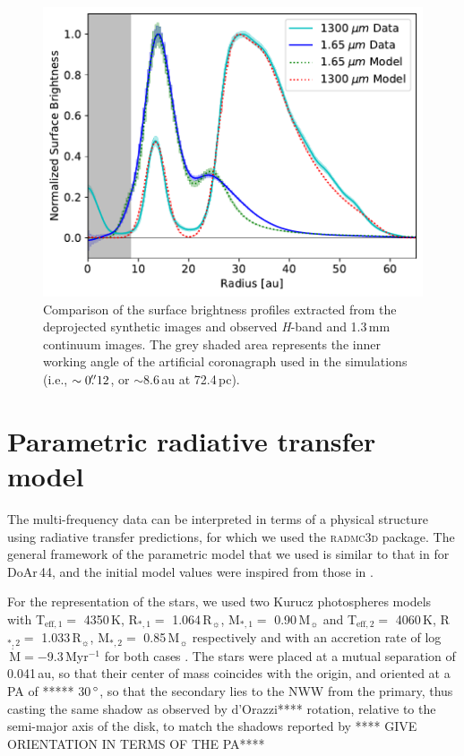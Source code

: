 \documentclass[letters,usenatbib,times]{mnras}
\begin{document}
\begin{figure}
	\includegraphics[width=\columnwidth]{comp_fig_all_profiles_au.pdf}
    \caption{Comparison of the surface brightness profiles extracted from the deprojected synthetic images and observed \textit{H}-band and 1.3\,mm continuum images. The grey shaded area represents the inner working angle of the artificial coronagraph used in the simulations (i.e., $\sim0\hbox{$.\!\!^{\prime\prime}$} 12$, or $\sim$8.6\,au at 72.4\,pc).}
    \label{fig:radprofiles}
\end{figure}

\section{Parametric radiative transfer model} \label{sec:model}

The multi-frequency data can be interpreted in terms of a physical
structure using radiative transfer predictions, for which we used the
\textsc{radmc3d} package\citep{Dullemond_2012}. The general framework
of the parametric model that we used is similar to that in
\citet{2018MNRAS.477.5104C} for DoAr\,44, and the initial model
values were inspired from those in \citet{Rosenfeld_2013}.

For the representation of the stars, we used two Kurucz photospheres models \citep{1979ApJS...40....1K, 1997A&A...318..841C} with T$_{\mathrm{eff},1} =$ 4350\,K, R$_{*,1} =$ 1.064\,R$_{\sun}$, M$_{*,1} =$ 0.90\,M$_{\sun}$ and T$_{\mathrm{eff},2} =$ 4060\,K, R$_{*,2} =$ 1.033\,R$_{\sun}$, M$_{*,2} =$ 0.85\,M$_{\sun}$ respectively and with an accretion rate of log$\,\dot{\mathrm{M}} = -$9.3\,Myr$^{-1}$ for both cases \citep{10.1111/j.1365-2966.2011.19366.x}. The stars were placed at a  mutual separation of 0.041\,au, so that their center of mass coincides with the origin,  and oriented at a PA of *****  30\,$\hbox{$^\circ$}$, so that the secondary lies to the NWW from the primary, thus casting the same shadow as observed by d'Orazzi****  rotation, relative to the semi-major axis of the disk, to match the shadows reported by \citet{dOrazi} **** GIVE ORIENTATION IN TERMS OF THE PA****
\end{document}
